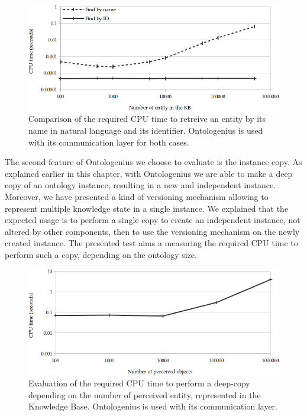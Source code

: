 \begin{figure}[ht!]
\centering
\includegraphics[width=\textwidth]{figures/chapter2/extra_tests/find.png}
\caption{\label{fig:chap2_extra_find} Comparison of the required CPU time to retreive an entity by its name in natural language and its identifier. Ontologenius is used with its communication layer for both cases.}
\end{figure}

The second feature of Ontologenius we choose to evaluate is the instance copy. As explained earlier in this chapter, with Ontologenius we are able to make a deep copy of an ontology instance, resulting in a new and independent instance. Moreover, we have presented a kind of versioning mechanism allowing to represent multiple knowledge state in a single instance. We explained that the expected usage is to perform a single copy to create an independent instance, not altered by other components, then to use the versioning mechanism on the newly created instance. The presented test aims a measuring the required CPU time to perform such a copy, depending on the ontology size.

\begin{figure}[ht!]
\centering
\includegraphics[width=\textwidth]{figures/chapter2/extra_tests/deepcopy.png}
\caption{\label{fig:chap2_extra_deepcopy} Evaluation of the required CPU time to perform a deep-copy depending on the number of perceived entity, represented in the Knowledge Base. Ontologenius is used with its communication layer. }
\end{figure}


